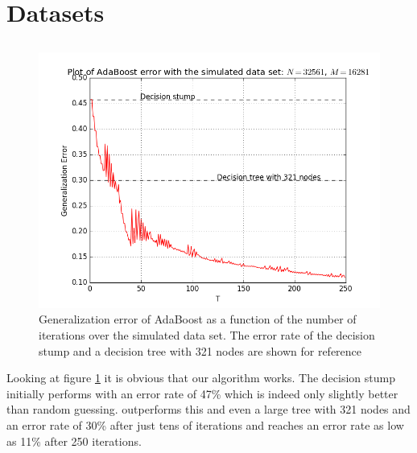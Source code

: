 \newpage
\section{Datasets}
\subsection{\adaB}
\label{subsec:AdaPracPerf}
\begin{figure}[!ht]
  \centering
      \includegraphics[width=\graphWidth]{generated/ADGD.png}
  \caption{Generalization error of AdaBoost as a function of the number of iterations over the simulated data set. The error rate of the decision stump and a decision tree with 321 nodes are shown for reference}
      \label{fig:adaBGD}
\end{figure}


\par Looking at figure \ref{fig:adaBGD} it is obvious that our algorithm works. The decision stump initially performs with an error rate of 47\% which is indeed only slightly better than random guessing. \adaB outperforms this and even a large tree with 321 nodes and an error rate of 30\% after just tens of iterations and reaches an error rate as low as 11\% after 250 iterations. 

